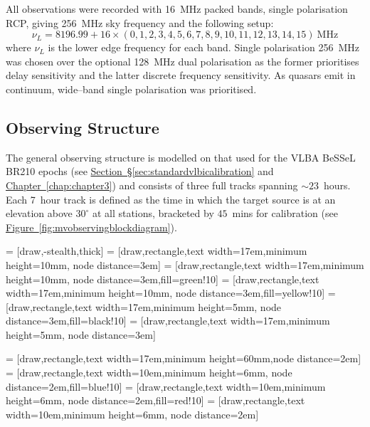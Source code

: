		All observations were recorded with 16~MHz packed bands, single polarisation RCP, giving 256~MHz sky frequency and the following setup:
		\begin{equation*}
		\nu_L = 8196.99+16\times(0,1,2,3,4,5,6,7,8,9,10,11,12,13,14,15)~\text{MHz}
		\end{equation*} where $\nu_L$ is the lower edge frequency for each band. Single polarisation 256~MHz was chosen over the optional 128~MHz dual polarisation as the former prioritises delay sensitivity and the latter discrete frequency sensitivity. As quasars emit in continuum, wide--band single polarisation was prioritised.
	    	
	\subsection{Observing Structure} \label{sec:obsstruct}
		The general observing structure is modelled on that used for the VLBA BeSSeL BR210 epochs (see \hyperref[sec:standardvlbicalibration]{Section~\S\ref*{sec:standardvlbicalibration}} and \hyperref[chap:chapter3]{Chapter~\ref*{chap:chapter3}}) and consists of three full tracks spanning $\sim23$~hours. Each 7~hour track is defined as the time in which the target source is at an elevation above $30^{\circ}$ at all stations, bracketed by $45$~mins for calibration (see \hyperref[fig:mvobservingblockdiagram]{Figure~\ref*{fig:mvobservingblockdiagram}}).
		
   = [draw,-stealth,thick]
  = [draw,rectangle,text width=17em,minimum height=10mm, node distance=3em]
 = [draw,rectangle,text width=17em,minimum height=10mm, node distance=3em,fill=green!10]
 = [draw,rectangle,text width=17em,minimum height=10mm, node distance=3em,fill=yellow!10]
 = [draw,rectangle,text width=17em,minimum height=5mm, node distance=3em,fill=black!10]
 = [draw,rectangle,text width=17em,minimum height=5mm, node distance=3em]

 = [draw,rectangle,text width=17em,minimum height=60mm,node distance=2em]
 = [draw,rectangle,text width=10em,minimum height=6mm, node distance=2em,fill=blue!10]
 = [draw,rectangle,text width=10em,minimum height=6mm, node distance=2em,fill=red!10]
 = [draw,rectangle,text width=10em,minimum height=6mm, node distance=2em]

